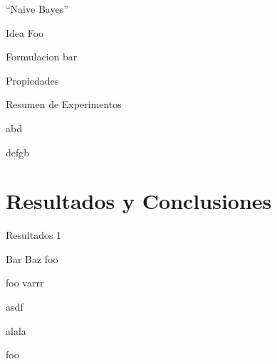 \documentclass[xcolor=x11names]{beamer}
\begin{document}
\begin{frame}{``Naive Bayes'' }
			\begin{block}{Idea}
				Foo
			\end{block}

			\begin{block}{Formulacion}
				bar
			\end{block}

			\begin{block}{Propiedades}
				
			\end{block}

\end{frame}



\begin{frame}{Resumen de Experimentos}
			
			abd
			\medskip

			defgb

%
\end{frame}


\section{Resultados y Conclusiones}



\begin{frame}{Resultados 1}
	\begin{block}{Bar}
		Baz
		\medskip
		foo
	\end{block}


	\begin{block}{foo}
		varrr

		\medskip
			asdf

		\medskip
		alala

		\medskip
		foo
	\end{block}
\end{frame}
\end{document}
